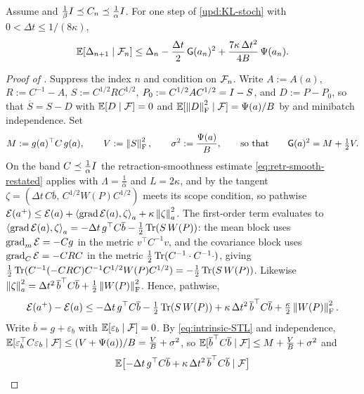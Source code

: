 \begin{lemma}
\label{lem:onestep-stoch-KL}
Assume  and $\tfrac1\beta I\preceq C_n\preceq\tfrac1\alpha I$. For
one step of \eqref{upd:KL-stoch} with $0<\Delta t\leq1/(8\kappa)$,
\begin{equation}
\label{eq:KL-onestep-Psi}
    \mathbb{E}[\Delta_{n+1}\mid\mathcal{F}_n]
    \leq\Delta_n-\frac{\Delta t}2\,\mathsf{G}(a_n)^2
    +\frac{7\kappa\,\Delta t^2}{4B}\,\Psi(a_n).
\end{equation}
\end{lemma}

\begin{proof}[Proof of ]
Suppress the index $n$ and condition on $\mathcal{F}_n$. Write $A:=A(a)$, $R:=C^{-1}-A$, $S:=C^{1/2}RC^{1/2}$,
$P_0:=C^{1/2}AC^{1/2}=I-S$, and $D:=P-P_0$, so that $\overline S=S-D$ with $\mathbb{E}[D\mid\mathcal{F}]=0$ and
$\mathbb{E}[\left\lVert D\right\rVert_{\mathrm{F}}^2\mid\mathcal{F}]=\Psi(a)/B$ by  and minibatch independence. Set
\[
    M:=g(a)^\top C\,g(a),\qquad V:=\left\lVert S\right\rVert_{\mathrm{F}}^2,\qquad\sigma^2:=\frac{\Psi(a)}B,
    \qquad\text{so that}\qquad\mathsf{G}(a)^2=M+\tfrac12V .
\]
On the band $C\preceq\tfrac1\alpha I$ the retraction-smoothness estimate
\eqref{eq:retr-smooth-restated} applies with $\Lambda=\tfrac1\alpha$ and $L=2\kappa$, and by
 the tangent $\zeta=(\Delta t\,C\overline b,\,C^{1/2}W(P)C^{1/2})$ meets its
scope condition, so pathwise
$\mathcal{E}(a^+)\leq\mathcal{E}(a)+\left\langle \operatorname{grad}\mathcal{E}(a),\zeta\right\rangle_a+\kappa\left\lVert \zeta\right\rVert_a^2$. The first-order term
evaluates to $\left\langle \operatorname{grad}\mathcal{E}(a),\zeta\right\rangle_a=-\Delta t\,g^\top C\overline b-\tfrac12\operatorname{Tr}(S\,W(P))$: the
mean block uses $\operatorname{grad}_m\mathcal{E}=-Cg$ in the metric $v^\top C^{-1}v$, and the covariance block uses
$\operatorname{grad}_C\mathcal{E}=-CRC$ in the metric $\tfrac12\operatorname{Tr}(C^{-1}\cdot C^{-1}\cdot)$, giving
$\tfrac12\operatorname{Tr}(C^{-1}(-CRC)C^{-1}C^{1/2}W(P)C^{1/2})=-\tfrac12\operatorname{Tr}(S\,W(P))$. Likewise
$\left\lVert \zeta\right\rVert_a^2=\Delta t^2\,\overline b^\top C\overline b+\tfrac12\left\lVert W(P)\right\rVert_{\mathrm{F}}^2$. Hence,
pathwise,
\[
    \mathcal{E}(a^+)-\mathcal{E}(a)
    \leq-\Delta t\,g^\top C\overline b-\tfrac12\operatorname{Tr}(S\,W(P))
    +\kappa\,\Delta t^2\,\overline b^\top C\overline b+\tfrac\kappa2\left\lVert W(P)\right\rVert_{\mathrm{F}}^2 .
\]
Write $\overline b=g+\varepsilon_b$ with $\mathbb{E}[\varepsilon_b\mid\mathcal{F}]=0$. By
\eqref{eq:intrinsic-STL} and independence,
$\mathbb{E}[\varepsilon_b^\top C\varepsilon_b\mid\mathcal{F}]\leq(V+\Psi(a))/B=\tfrac VB+\sigma^2$, so
$\mathbb{E}[\overline b^\top C\overline b\mid\mathcal{F}]\leq M+\tfrac VB+\sigma^2$ and
\begin{equation}
\label{eq:KL-mean}
    \E\bigl[-\Delta t\,g^\top C\overline b+\kappa\,\Delta t^2\,\overline b^\top C\overline b\mid\Fil\bigr]

\end{equation}
\end{proof}
